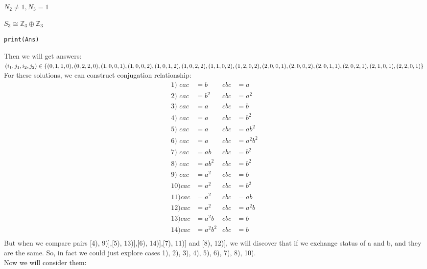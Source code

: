 \documentclass[a4paper,14pt]{article}
\begin{document}
\begin{enumerate}
\begin{item}{$N_2 \neq 1, N_3 = 1$}
\begin{enumerate}
\begin{item}{$S_3\cong \mathbb{Z}_3 \oplus \mathbb{Z}_3$}
\begin{verbatim}
print(Ans)
                    \end{verbatim}
                    Then we will get answers:
                    $(i_1,j_1,i_2,j_2) \in \{(0, 1, 1, 0), (0, 2, 2, 0), (1, 0, 0, 1), (1, 0, 0, 2), (1, 0, 1, 2),\\
                     (1, 0, 2, 2), (1, 1, 0, 2), (1, 2, 0, 2), (2, 0, 0, 1), (2, 0, 0, 2), (2, 0, 1, 1), (2, 0, 2, 1),\\
                     (2, 1, 0, 1), (2, 2, 0, 1)\}$\\
                     For these solutions, we can construct conjugation relationship:
                     \begin{align*}
                         \text{1) } cac&=b      &   cbc&=a\\
                         \text{2) } cac&=b^2    &   cbc&=a^2\\
                         \text{3) } cac&=a      &   cbc&=b\\
                         \text{4) } cac&=a      &   cbc&=b^2\\
                         \text{5) } cac&=a      &   cbc&=ab^2\\
                         \text{6) } cac&=a      &   cbc&=a^2b^2\\
                         \text{7) } cac&=ab     &   cbc&=b^2\\
                         \text{8) } cac&=ab^2   &   cbc&=b^2\\
                         \text{9) } cac&=a^2    &   cbc&=b\\
                         \text{10)} cac&=a^2    &   cbc&=b^2\\
                         \text{11)} cac&=a^2    &   cbc&=ab\\
                         \text{12)} cac&=a^2    &   cbc&=a^2b\\
                         \text{13)} cac&=a^2b   &   cbc&=b\\
                         \text{14)} cac&=a^2b^2 &   cbc&=b\\
                     \end{align*}
                     But when we compare pairs [4), 9)],[5), 13)],[6), 14)],[7), 11)] and [8), 12)], we will discover that if we exchange status of a and b, and
                     they are the same. So, in fact we could just explore cases 1), 2), 3), 4), 5), 6), 7), 8), 10).\\
                     Now we will consider them:
                     \begin{enumerate}

\end{enumerate}
\end{item}
\end{enumerate}
\end{item}
\end{enumerate}
\end{document}
